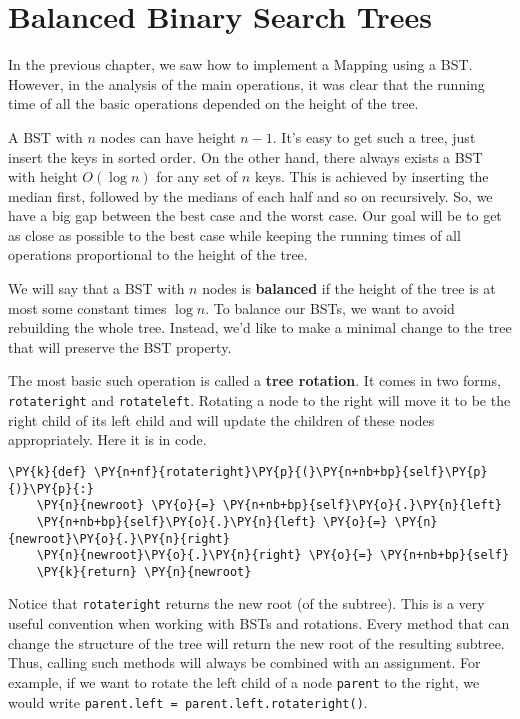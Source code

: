 \chapter{Balanced Binary Search Trees}


In the previous chapter, we saw how to implement a Mapping using a BST.
However, in the analysis of the main operations, it was clear that the running time of all the basic operations depended on the height of the tree.


A BST with $n$ nodes can have height $n-1$.
It's easy to get such a tree, just insert the keys in sorted order.
On the other hand, there always exists a BST with height $O(\log n)$ for any set of $n$ keys.
This is achieved by inserting the median first, followed by the medians of each half and so on recursively.
So, we have a big gap between the best case and the worst case.
Our goal will be to get as close as possible to the best case while keeping the running times of all operations proportional to the height of the tree.


We will say that a BST with $n$ nodes is \textbf{balanced} if the height of the tree is at most some constant times $\log n$.
To balance our BSTs, we want to avoid rebuilding the whole tree.
Instead, we'd like to make a minimal change to the tree that will preserve the BST property.


The most basic such operation is called a \textbf{tree rotation}.
It comes in two forms, \texttt{rotateright} and \texttt{rotateleft}.
Rotating a node to the right will move it to be the right child of its left child and will update the children of these nodes appropriately.
Here it is in code.

\begin{Verbatim}[commandchars=\\\{\}]
\PY{k}{def} \PY{n+nf}{rotateright}\PY{p}{(}\PY{n+nb+bp}{self}\PY{p}{)}\PY{p}{:}
    \PY{n}{newroot} \PY{o}{=} \PY{n+nb+bp}{self}\PY{o}{.}\PY{n}{left}
    \PY{n+nb+bp}{self}\PY{o}{.}\PY{n}{left} \PY{o}{=} \PY{n}{newroot}\PY{o}{.}\PY{n}{right}
    \PY{n}{newroot}\PY{o}{.}\PY{n}{right} \PY{o}{=} \PY{n+nb+bp}{self}
    \PY{k}{return} \PY{n}{newroot}
\end{Verbatim}



Notice that \texttt{rotateright} returns the new root (of the subtree).
This is a very useful convention when working with BSTs and rotations.
Every method that can change the structure of the tree will return the new root of the resulting subtree.
Thus, calling such methods will always be combined with an assignment.
For example, if we want to rotate the left child of a node \texttt{parent} to the right, we would write \texttt{parent.left = parent.left.rotateright()}.

